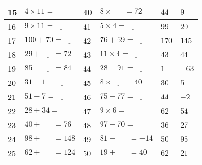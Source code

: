 \documentclass[french,a4paper,10pt]{article}
\begin{document}
\begin{tabular}{|p{0.4cm}|p{4cm}|p{0.4cm}|p{4cm}||p{1cm}|p{1cm}|}
\hline
15 & $4 \times 11 = \underline{\phantom{999}}$ & 40 & $8 \times \underline{\phantom{999}} = 72$ & $44$ & $9$ \\
\hline
16 & $9 \times 11 = \underline{\phantom{999}}$ & 41 & $5 \times 4 = \underline{\phantom{999}}$ & $99$ & $20$ \\
\hline
17 & $100 + 70 = \underline{\phantom{999}}$ & 42 & $76 + 69 = \underline{\phantom{999}}$ & $170$ & $145$ \\
\hline
18 & $29 + \underline{\phantom{999}} = 72$ & 43 & $11 \times 4 = \underline{\phantom{999}}$ & $43$ & $44$ \\
\hline
19 & $85 - \underline{\phantom{999}} = 84$ & 44 & $28 - 91 = \underline{\phantom{999}}$ & $1$ & $-63$ \\
\hline
20 & $31 - 1 = \underline{\phantom{999}}$ & 45 & $8 \times \underline{\phantom{999}} = 40$ & $30$ & $5$ \\
\hline
21 & $51 - 7 = \underline{\phantom{999}}$ & 46 & $75 - 77 = \underline{\phantom{999}}$ & $44$ & $-2$ \\
\hline
22 & $28 + 34 = \underline{\phantom{999}}$ & 47 & $9 \times 6 = \underline{\phantom{999}}$ & $62$ & $54$ \\
\hline
23 & $40 + \underline{\phantom{999}} = 76$ & 48 & $97 - 70 = \underline{\phantom{999}}$ & $36$ & $27$ \\
\hline
24 & $98 + \underline{\phantom{999}} = 148$ & 49 & $81 - \underline{\phantom{999}} = -14$ & $50$ & $95$ \\
\hline
25 & $62 + \underline{\phantom{999}} = 124$ & 50 & $19 + \underline{\phantom{999}} = 40$ & $62$ & $21$ \\
\hline

\end{tabular}
\begin{center}
\hspace*{1.2cm}
\end{center}                 
\end{document}
